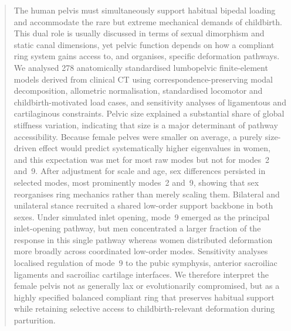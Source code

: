 \documentclass[openacc]{rsproca_new}
\begin{document}
\begin{abstract}
The human pelvis must simultaneously support habitual bipedal loading and accommodate the rare but extreme mechanical demands of childbirth. This dual role is usually discussed in terms of sexual dimorphism and static canal dimensions, yet pelvic function depends on how a compliant ring system gains access to, and organises, specific deformation pathways. We analysed 278 anatomically standardised lumbopelvic finite-element models derived from clinical CT using correspondence-preserving modal decomposition, allometric normalisation, standardised locomotor and childbirth-motivated load cases, and sensitivity analyses of ligamentous and cartilaginous constraints. Pelvic size explained a substantial share of global stiffness variation, indicating that size is a major determinant of pathway accessibility. Because female pelves were smaller on average, a purely size-driven effect would predict systematically higher eigenvalues in women, and this expectation was met for most raw modes but not for modes~2 and~9. After adjustment for scale and age, sex differences persisted in selected modes, most prominently modes~2 and~9, showing that sex reorganises ring mechanics rather than merely scaling them. Bilateral and unilateral stance recruited a shared low-order support backbone in both sexes. Under simulated inlet opening, mode~9 emerged as the principal inlet-opening pathway, but men concentrated a larger fraction of the response in this single pathway whereas women distributed deformation more broadly across coordinated low-order modes. Sensitivity analyses localised regulation of mode~9 to the pubic symphysis, anterior sacroiliac ligaments and sacroiliac cartilage interfaces. We therefore interpret the female pelvis not as generally lax or evolutionarily compromised, but as a highly specified balanced compliant ring that preserves habitual support while retaining selective access to childbirth-relevant deformation during parturition.
\end{abstract}

\maketitle
\end{document}

